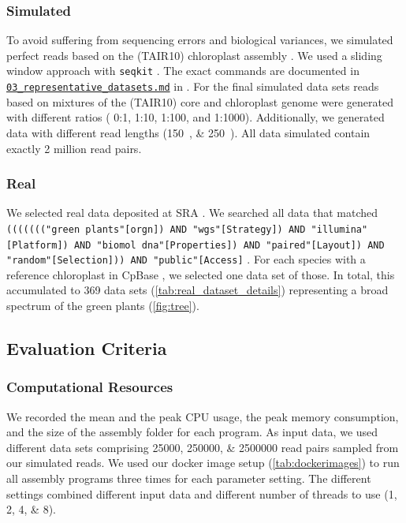 \documentclass{bmcart}
\newcommand{\zenododataset}{\cite{zenododataset}}
\begin{document}
\subsubsection*{Simulated}
To avoid suffering from sequencing errors and biological variances, we simulated perfect reads based on the  (TAIR10) chloroplast assembly \cite{tair10}.
We used a sliding window approach with \texttt{seqkit} \cite{seqkit}. The exact commands are documented in \href{https://github.com/chloroExtractorTeam/benchmark/blob/master/03_representative_datasets.md}{\texttt{03\_representative\_datasets.md}} in \zenododataset{}.
For the final simulated data sets reads based on mixtures of the  (TAIR10) core and chloroplast genome were generated with different ratios ( \num{0}:\num{1}, \num{1}:\num{10}, \num{1}:\num{100}, and \num{1}:\num{1000}).
Additionally, we generated data with different read lengths (\SIlist{150;250}{\basepair}). All data simulated contain exactly 2 million read pairs.


\subsubsection*{Real}
We selected real data deposited at SRA \cite{sra2010}.
We searched all data that matched  \texttt{((((((("green plants"[orgn]) AND "wgs"[Strategy]) AND "illumina"[Platform]) AND "biomol dna"[Properties]) AND "paired"[Layout]) AND "random"[Selection])) AND "public"[Access]} \cite{sra_search_term}. 
For each species with a reference chloroplast in CpBase \cite{cpbase}, we selected one data set of those.
In total, this accumulated to \num{369} data sets (\cref{tab:real_dataset_details}) representing a broad spectrum of the green plants (\cref{fig:tree}).

\subsection*{Evaluation Criteria}
\subsubsection*{Computational Resources}
We recorded the mean and the peak CPU usage, the peak memory consumption, and the size of the assembly folder for each program. 
As input data, we used different data sets comprising \numlist{25000;250000;2500000} read pairs sampled from  our simulated reads.
We used our docker image setup (\cref{tab:dockerimages}) to run all assembly programs three times for each parameter setting.
The different settings combined different input data and different number of threads to use (\numlist{1;2;4;8}).
\end{document}
